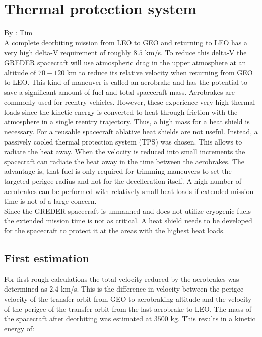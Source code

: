 \chapter{Thermal protection system}
\qquad \underline{By} : Tim\\

A complete deorbiting mission from LEO to GEO and returning to LEO has a very high delta-V requirement of  roughly $8.5$ km/s. To reduce this delta-V the GREDER spacecraft will use atmospheric drag in the upper atmosphere at an altitude of $70-120$ km to reduce its relative velocity when returning from GEO to LEO. This kind of maneuver is called an aerobrake and has the potential to save a significant amount of fuel and total spacecraft mass. Aerobrakes are commonly used for reentry vehicles. However, these experience very high thermal loads since the kinetic energy is converted to heat through friction with the atmosphere in a single reentry trajectory. Thus, a high mass for a heat shield is necessary. For a reusable spacecraft ablative heat shields are not useful. Instead, a passively cooled thermal protection system (TPS) was chosen. This allows to radiate the heat away. When the velocity is reduced into small increments the spacecraft can radiate the heat away in the time between the aerobrakes. The advantage is, that fuel is only required for trimming maneuvers to set the targeted perigee radius and not for the decelleration itself. A high number of aerobrakes can be performed with relatively small heat loads if extended mission time is not of a large concern.\\

Since the GREDER spacecraft is unmanned and does not utilize cryogenic fuels the extended mission time is not as critical. A heat shield needs to be developed for the spacecraft to protect it at the areas with the highest heat loads.

\section{First estimation}

\qquad For first rough calculations the total velocity reduced by the aerobrakes was determined as $2.4$ km/s. This is the difference in velocity between the perigee velocity of the transfer orbit from GEO to aerobraking altitude and the velocity of the perigee of the transfer orbit from the last aerobrake to LEO. The mass of the spacecraft after deorbiting was estimated at $3500$ kg. This results in a kinetic energy of:

